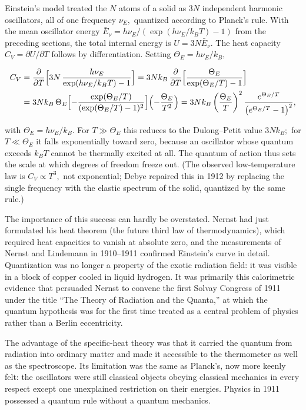 Einstein's model treated the $N$ atoms of a solid as $3N$ independent harmonic oscillators, all of one frequency $\nu_E,$ quantized according to Planck's rule. With the mean oscillator energy $\bar{E}_\nu=h\nu_E/(\exp(h\nu_E/k_BT)-1)$ from the preceding sections, the total internal energy is $U=3N\bar{E}_\nu.$ The heat capacity $C_V=\partial U/\partial T$ follows by differentiation. Setting $\Theta_E=h\nu_E/k_B,$
\begin{linenomath}
    \begin{align}
        C_V
        &=\frac{\partial}{\partial T}\Bigl[3N\,\frac{h\nu_E}{\exp(h\nu_E/k_BT)-1}\Bigr]
        =3Nk_B\,\frac{\partial}{\partial T}\Bigl[\frac{\Theta_E}{\exp(\Theta_E/T)-1}\Bigr]\nonumber\\
        &=3Nk_B\,\Theta_E\Bigl[-\frac{\exp(\Theta_E/T)}{(\exp(\Theta_E/T)-1)^{2}}\Bigr]\Bigl(-\frac{\Theta_E}{T^{2}}\Bigr)
        =3Nk_B\left(\frac{\Theta_E}{T}\right)^2
        \frac{e^{\Theta_E/T}}{\left(e^{\Theta_E/T}-1\right)^2},
    \end{align}
\end{linenomath}
with $\Theta_E=h\nu_E/k_B.$
For $T\gg\Theta_E$ this reduces to the Dulong--Petit value $3Nk_B;$ for $T\ll\Theta_E$ it falls exponentially toward zero, because an oscillator whose quantum exceeds $k_BT$ cannot be thermally excited at all. The quantum of action thus sets the scale at which degrees of freedom freeze out. (The observed low-temperature law is $C_V\propto T^3,$ not exponential; Debye repaired this in 1912 by replacing the single frequency with the elastic spectrum of the solid, quantized by the same rule.)

The importance of this success can hardly be overstated. Nernst had just formulated his heat theorem (the future third law of thermodynamics), which required heat capacities to vanish at absolute zero, and the measurements of Nernst and Lindemann in 1910--1911 confirmed Einstein's curve in detail. Quantization was no longer a property of the exotic radiation field: it was visible in a block of copper cooled in liquid hydrogen. It was primarily this calorimetric evidence that persuaded Nernst to convene the first Solvay Congress of 1911 under the title ``The Theory of Radiation and the Quanta,'' at which the quantum hypothesis was for the first time treated as a central problem of physics rather than a Berlin eccentricity.

The advantage of the specific-heat theory was that it carried the quantum from radiation into ordinary matter and made it accessible to the thermometer as well as the spectroscope. Its limitation was the same as Planck's, now more keenly felt: the oscillators were still classical objects obeying classical mechanics in every respect except one unexplained restriction on their energies. Physics in 1911 possessed a quantum rule without a quantum mechanics.

